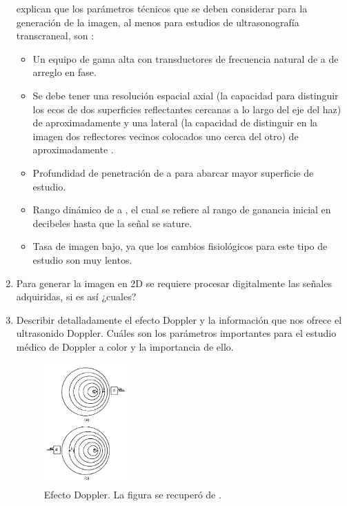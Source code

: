 \begin{enumerate}
  \citet{godau_berg_2013} explican que los parámetros técnicos que se deben considerar para la generación de la imagen, al menos para estudios de ultrasonografía transcraneal, son \citep{matthew}: 
  
  
    
\begin{itemize}
  \item Un equipo de gama alta con transductores de frecuencia natural de  a  de arreglo en fase.
  \item Se debe tener una resolución espacial axial (la capacidad para distinguir los ecos de dos superficies reflectantes cercanas a lo largo del eje del haz) de aproximadamente   y una lateral (la capacidad de distinguir en la imagen dos reflectores vecinos colocados uno cerca del otro) de aproximadamente .
  \item Profundidad de penetración de  a  para abarcar mayor superficie de estudio.
  \item  Rango dinámico de  a , el cual se refiere al rango de ganancia inicial en decibeles hasta que la señal se sature.
  \item Tasa de imagen bajo, ya que los cambios fisiológicos para este tipo de estudio son muy lentos.
\end{itemize}

  \item Para generar la imagen en 2D se requiere procesar digitalmente las señales adquiridas, si es así ¿cuales?
  




  \item Describir detalladamente el efecto Doppler y la información que nos ofrece el ultrasonido Doppler. Cuáles son los parámetros importantes para el estudio médico de Doppler a color y la importancia de ello.
  

\begin{adjustbox}{valign=T,raise=\strutheight,minipage={\linewidth}}
  \begin{figure}
    \centering
    \captionsetup{margin=5pt}
    \includegraphics[width=0.3\textwidth]{./figuras/p9_0.pdf}
    \caption{Efecto Doppler. La figura se recuperó de \citet{russ}.}
    \label{p9:0}
  \end{figure}
\strut{}  


\end{adjustbox}
\end{enumerate}

